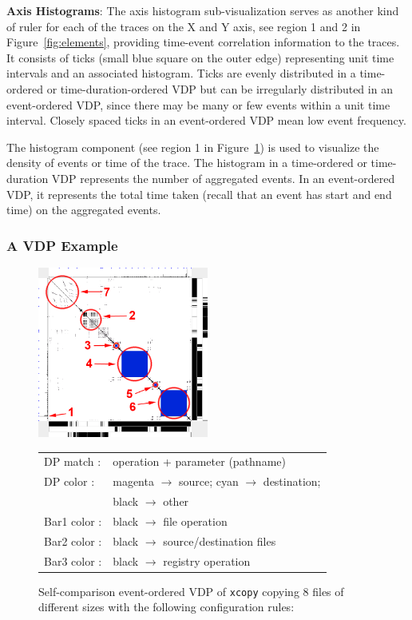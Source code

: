 {\bf Axis Histograms}:
The axis histogram sub-visualization
serves as another kind of ruler for each of the traces on the X and Y axis,
see region 1 and 2 in Figure~\ref{fig:elements}, providing
time-event correlation information to the traces.
It consists of
ticks (small blue square on the outer edge) representing unit time intervals
and an associated histogram.
Ticks are evenly distributed in a time-ordered or time-duration-ordered VDP
but can be irregularly distributed in an event-ordered VDP,
since there may be many or few events within a unit time interval.
Closely spaced ticks in an event-ordered VDP mean low event frequency.

The histogram component (see region 1 in Figure~\ref{fig:cp-xcopy})
is used to visualize the density of events or time
of the trace.
The histogram in a time-ordered or time-duration VDP
represents the number of aggregated events.
In an event-ordered VDP,
it represents the total time taken (recall that an event has start and end
time) on the aggregated events.

\subsubsection{A VDP Example}

\begin{figure}[htb]
\begin{center}
\includegraphics[width=0.5\textwidth]{lviz/cp-xcopy.png}
\caption{Self-comparison event-ordered VDP of {\tt xcopy}
copying 8 files of different sizes with the following configuration rules:
}
\begin{tabular}{ll}
DP match : & operation + parameter (pathname)\\
DP color : & magenta $\rightarrow$ source; cyan $\rightarrow$ destination;\\
 & black $\rightarrow$ other\\
Bar1 color : & black $\rightarrow$ file operation\\
Bar2 color : & black $\rightarrow$ source/destination files\\
Bar3 color : & black $\rightarrow$ registry operation
\end{tabular}
\label{fig:cp-xcopy}
\end{center}
\end{figure}


